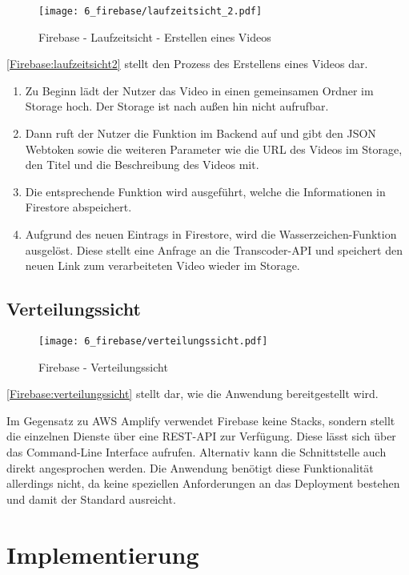 \begin{figure}
  \centering
  \texttt{[image: 6\_firebase/laufzeitsicht\_2.pdf]}
  \caption{Firebase - Laufzeitsicht - Erstellen eines Videos}
  \label{Firebase:laufzeitsicht2}
\end{figure}

\autoref{Firebase:laufzeitsicht2} stellt den Prozess des Erstellens eines Videos dar.
\begin{enumerate}
  \item{Zu Beginn lädt der Nutzer das Video in einen gemeinsamen Ordner im Storage hoch. Der Storage ist nach außen hin nicht aufrufbar.}
  \item{Dann ruft der Nutzer die Funktion im Backend auf und gibt den JSON Webtoken sowie die weiteren Parameter wie die URL des Videos im Storage, den Titel und die Beschreibung des Videos mit.}
  \item{Die entsprechende Funktion wird ausgeführt, welche die Informationen in Firestore abspeichert.}
  \item{Aufgrund des neuen Eintrags in Firestore, wird die Wasserzeichen-Funktion ausgelöst. Diese stellt eine Anfrage an die Transcoder-API und speichert den neuen Link zum verarbeiteten Video wieder im Storage.}
\end{enumerate}

\subsection{Verteilungssicht}

\begin{figure}
  \centering
  \texttt{[image: 6\_firebase/verteilungssicht.pdf]}
  \caption{Firebase - Verteilungssicht}
  \label{Firebase:verteilungssicht}
\end{figure}

\autoref{Firebase:verteilungssicht} stellt dar, wie die Anwendung bereitgestellt wird.

Im Gegensatz zu \ac{AWS} Amplify verwendet Firebase keine Stacks, sondern stellt die einzelnen Dienste über eine \ac{REST}-API zur Verfügung. Diese lässt sich über das Command-Line Interface aufrufen. Alternativ kann die Schnittstelle auch direkt angesprochen werden. Die Anwendung benötigt diese Funktionalität allerdings nicht, da keine speziellen Anforderungen an das Deployment bestehen und damit der Standard ausreicht.

\section{Implementierung}

